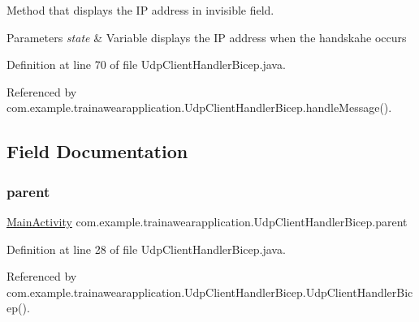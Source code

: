 Method that displays the IP address in invisible field. 


\begin{DoxyParams}{Parameters}
{\em state} & Variable displays the IP address when the handskahe occurs \\
\hline
\end{DoxyParams}


Definition at line 70 of file Udp\+Client\+Handler\+Bicep.\+java.


\begin{DoxyCode}{0}

\end{DoxyCode}


Referenced by com.\+example.\+trainawearapplication.\+Udp\+Client\+Handler\+Bicep.\+handle\+Message().



\subsection{Field Documentation}
\mbox{\label{classcom_1_1example_1_1trainawearapplication_1_1_udp_client_handler_bicep_a0b203f16a962458064aebb68efbd72bb}} 
\subsubsection{\texorpdfstring{parent}{parent}}
{\footnotesize\ttfamily \mbox{\hyperlink{classcom_1_1example_1_1trainawearapplication_1_1_main_activity}{Main\+Activity}} com.\+example.\+trainawearapplication.\+Udp\+Client\+Handler\+Bicep.\+parent\hspace{0.3cm}{\ttfamily [private]}}



Definition at line 28 of file Udp\+Client\+Handler\+Bicep.\+java.



Referenced by com.\+example.\+trainawearapplication.\+Udp\+Client\+Handler\+Bicep.\+Udp\+Client\+Handler\+Bicep().


